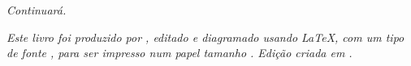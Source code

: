 \cleardoublepage

\null
\vfill

\begin{flushright}
{\normalsize \it Continuará.
\vspace*{4pt}}
\end{flushright}

\newpage

\null
\vfill
\thispagestyle{empty}


{\normalsize \it Este livro foi produzido por \myauthor, editado e diagramado usando \LaTeX,
com um tipo de fonte \showfont, 
para ser impresso num papel tamanho \imprimirpapersize. Edição criada em \imprimirdata.
\vspace*{4pt}}






